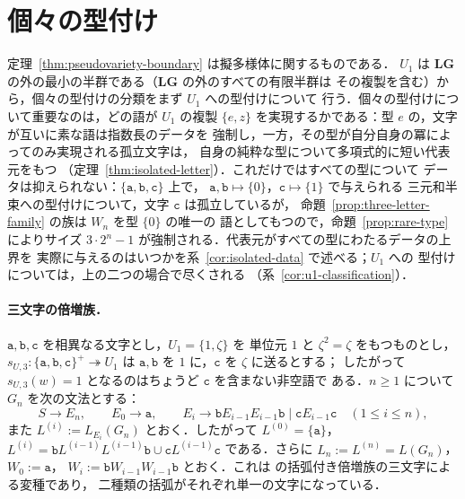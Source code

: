\documentclass[11pt,a4paper]{ltjsarticle}
\numberwithin{equation}{section}
\theoremstyle{plain}
\theoremstyle{definition}
\theoremstyle{remark}
\theoremstyle{plain}
\newcommand{\LG}{\mathbf{LG}}
\begin{document}
\section{個々の型付け}
\label{sec:typings}

定理~\ref{thm:pseudovariety-boundary} は擬多様体に関するものである．
$U_1$ は $\LG$ の外の最小の半群である（$\LG$ の外のすべての有限半群は
その複製を含む）から，個々の型付けの分類をまず $U_1$ への型付けについて
行う．個々の型付けについて重要なのは，どの語が $U_1$ の複製 $\{e,z\}$
を実現するかである：型 $e$ の，文字が互いに素な語は指数長のデータを
強制し，一方，その型が自分自身の冪によってのみ実現される孤立文字は，
自身の純粋な型について多項式的に短い代表元をもつ
（定理~\ref{thm:isolated-letter}）．これだけではすべての型について
データは抑えられない：$\{\mathtt a,\mathtt b,\mathtt c\}$ 上で，
$\mathtt a,\mathtt b\mapsto\{0\}$，$\mathtt c\mapsto\{1\}$ で与えられる
三元和半束への型付けについて，文字 $\mathtt c$ は孤立しているが，
命題~\ref{prop:three-letter-family} の族は $W_n$ を型 $\{0\}$ の唯一の
語としてもつので，命題~\ref{prop:rare-type} によりサイズ
$3\cdot2^n-1$ が強制される．代表元がすべての型にわたるデータの上界を
実際に与えるのはいつかを系~\ref{cor:isolated-data} で述べる；$U_1$ への
型付けについては，上の二つの場合で尽くされる
（系~\ref{cor:u1-classification}）．

\paragraph{三文字の倍増族．}
$\mathtt a,\mathtt b,\mathtt c$ を相異なる文字とし，$U_1=\{1,\zeta\}$ を
単位元 $1$ と $\zeta^2=\zeta$ をもつものとし，
$s_{U,3}:\{\mathtt a,\mathtt b,\mathtt c\}^+\twoheadrightarrow U_1$ は
$\mathtt a,\mathtt b$ を $1$ に，$\mathtt c$ を $\zeta$ に送るとする；
したがって $s_{U,3}(w)=1$ となるのはちょうど $\mathtt c$ を含まない非空語で
ある．$n\ge1$ について $G_n$ を次の文法とする：
\[
 S\to E_n,\qquad E_0\to\mathtt a,\qquad
 E_i\to\mathtt bE_{i-1}E_{i-1}\mathtt b\mid\mathtt cE_{i-1}\mathtt c\quad(1\le i\le n),
\]
また $L^{(i)}:=L_{E_i}(G_n)$ とおく．したがって $L^{(0)}=\{\mathtt a\}$，
$L^{(i)}=\mathtt bL^{(i-1)}L^{(i-1)}\mathtt b\cup\mathtt cL^{(i-1)}\mathtt c$
である．さらに $L_n:=L^{(n)}=L(G_n)$，$W_0:=\mathtt a$，
$W_i:=\mathtt bW_{i-1}W_{i-1}\mathtt b$ とおく．これは
\cite[命題~6.4]{kuriyamaCFG} の括弧付き倍増族の三文字による変種であり，
二種類の括弧がそれぞれ単一の文字になっている．
\end{document}
